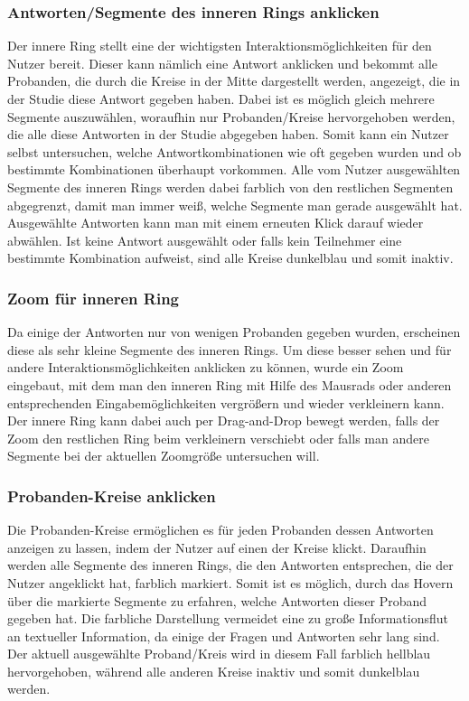 \documentclass{mi-seminar}
\begin{document}
\subsubsection{Antworten/Segmente des inneren Rings anklicken}
Der innere Ring stellt eine der wichtigsten Interaktionsmöglichkeiten für den Nutzer bereit. Dieser kann nämlich eine Antwort anklicken und bekommt alle Probanden, die durch die Kreise in der Mitte dargestellt werden, angezeigt, die in der Studie diese Antwort gegeben haben. Dabei ist es möglich gleich mehrere Segmente auszuwählen, woraufhin nur  Probanden/Kreise hervorgehoben werden, die alle diese Antworten in der Studie abgegeben haben. Somit kann ein Nutzer selbst untersuchen, welche Antwortkombinationen wie oft gegeben wurden und ob bestimmte Kombinationen überhaupt vorkommen. Alle vom Nutzer ausgewählten Segmente des inneren Rings werden dabei farblich von den restlichen Segmenten abgegrenzt, damit man immer weiß, welche Segmente man gerade ausgewählt hat. Ausgewählte Antworten kann man mit einem erneuten Klick darauf wieder abwählen. Ist keine Antwort ausgewählt oder falls kein Teilnehmer eine bestimmte Kombination aufweist, sind alle Kreise dunkelblau und somit inaktiv. 

\subsubsection{Zoom für inneren Ring}
Da einige der Antworten nur von wenigen Probanden gegeben wurden, erscheinen diese als sehr kleine Segmente des inneren Rings. Um diese besser sehen und für andere Interaktionsmöglichkeiten anklicken zu können, wurde ein Zoom eingebaut, mit dem man den inneren Ring mit Hilfe des Mausrads oder anderen entsprechenden Eingabemöglichkeiten vergrößern und wieder verkleinern kann. Der innere Ring kann dabei auch per Drag-and-Drop bewegt werden, falls der Zoom den restlichen Ring beim verkleinern verschiebt oder falls man andere Segmente bei der aktuellen Zoomgröße untersuchen will. 

\subsubsection{Probanden-Kreise anklicken}
Die Probanden-Kreise ermöglichen es für jeden Probanden dessen Antworten anzeigen zu lassen, indem der Nutzer auf einen der Kreise klickt. Daraufhin werden alle Segmente des inneren Rings, die den Antworten entsprechen, die der Nutzer angeklickt hat, farblich markiert. Somit ist es möglich, durch das Hovern über die markierte Segmente zu erfahren, welche Antworten dieser Proband gegeben hat. Die farbliche Darstellung vermeidet eine zu große Informationsflut an textueller Information, da einige der Fragen und Antworten sehr lang sind. Der aktuell ausgewählte Proband/Kreis wird in diesem Fall farblich hellblau hervorgehoben, während alle anderen Kreise inaktiv und somit dunkelblau werden.
\end{document}
